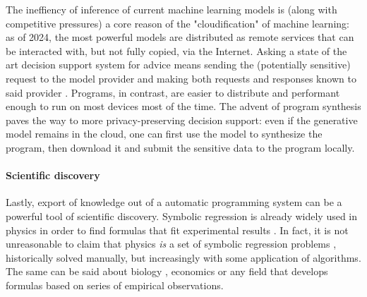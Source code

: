 The ineffiency of inference of current machine learning models is (along with competitive pressures) a core reason of the "cloudification" of machine learning: as of 2024, the most powerful models \cite{achiamGpt4TechnicalReport2023} are distributed as remote services that can be interacted with, but not fully copied, via the Internet.
Asking a state of the art decision support system for advice means sending the (potentially sensitive) request to the model provider and making both requests and responses known to said provider \cite{PrivacyPolicy}.
Programs, in contrast, are easier to distribute and performant enough to run on most devices most of the time.
The advent of program synthesis paves the way to more privacy-preserving decision support: even if the generative model remains in the cloud, one can first use the model to synthesize the program, then download it and submit the sensitive data to the program locally.

\paragraph{Scientific discovery}

Lastly, export of knowledge out of a automatic programming system can be a powerful tool of scientific discovery. 
Symbolic regression is already widely used in physics in order to find formulas that fit experimental results \cite{angelisArtificialIntelligencePhysical2023, tenachiDeepSymbolicRegression2023}. 
In fact, it is not unreasonable to claim that physics \emph{is} a set of symbolic regression problems \cite{udrescuAIFeynmanPhysicsinspired2020}, historically solved manually, but increasingly with some application of algorithms. 
The same can be said about biology \cite{chenRevealingComplexEcological2019}, economics \cite{claveriaAssessmentEffectFinancial2017, lianModelingForecastingPassenger2018, panInfluentialFactorsCarbon2019, truscottDetectingShadowEconomy2011, truscottExplainingUnemploymentRates2014, yamashitaCustomizedPredictionAttendance2022} or any field that develops formulas based on series of empirical observations.
